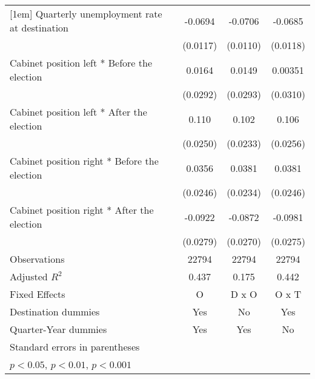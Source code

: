 \begin{table}[htbp]
\begin{tabular}{l*{3}{c}}
[1em]
Quarterly unemployment rate at destination&     -0.0694\sym{***}&     -0.0706\sym{***}&     -0.0685\sym{***}\\
                    &    (0.0117)         &    (0.0110)         &    (0.0118)         \\
[1em]
Cabinet position left * Before the election&      0.0164         &      0.0149         &     0.00351         \\
                    &    (0.0292)         &    (0.0293)         &    (0.0310)         \\
[1em]
Cabinet position left * After the election&       0.110\sym{***}&       0.102\sym{***}&       0.106\sym{***}\\
                    &    (0.0250)         &    (0.0233)         &    (0.0256)         \\
[1em]
Cabinet position right * Before the election&      0.0356         &      0.0381         &      0.0381         \\
                    &    (0.0246)         &    (0.0234)         &    (0.0246)         \\
[1em]
Cabinet position right * After the election&     -0.0922\sym{**} &     -0.0872\sym{**} &     -0.0981\sym{***}\\
                    &    (0.0279)         &    (0.0270)         &    (0.0275)         \\
\hline
Observations        &       22794         &       22794         &       22794         \\
Adjusted \(R^{2}\)  &       0.437         &       0.175         &       0.442         \\
Fixed Effects       &           O         &       D x O         &       O x T         \\
Destination dummies &         Yes         &          No         &         Yes         \\
Quarter-Year dummies&         Yes         &         Yes         &          No         \\
\hline\hline
\multicolumn{4}{l}{\footnotesize Standard errors in parentheses}\\
\multicolumn{4}{l}{\footnotesize \sym{*} \(p<0.05\), \sym{**} \(p<0.01\), \sym{***} \(p<0.001\)}\\
\end{tabular}
\end{table}
